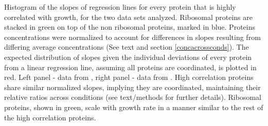 \label{fig:globalfit}
    Histogram of the slopes of regression lines for every protein that is highly correlated with growth, for the two data sets analyzed.
    Ribosomal proteins are stacked in green on top of the non ribosomal proteins, marked in blue.
    Proteins concentrations were normalized to account for differences in slopes resulting from differing average concentrations (See text and section \ref{concacrossconds}).
    The expected distribution of slopes given the individual deviations of every protein from a linear regression line, assuming all proteins are coordinated, is plotted in red.
    Left panel - data from \cite{Heinemann2014}, right panel - data from \cite{Valgepea2013}.
    High correlation proteins share similar normalized slopes, implying they are coordinated, maintaining their relative ratios across conditions (see text/methods for further details).
    Ribosomal proteins, shown in green, scale with growth rate in a manner similar to the rest of the high correlation proteins.
